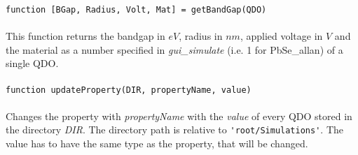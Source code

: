 			\lstinline{function [BGap, Radius, Volt, Mat] = getBandGap(QDO)} \\ \\
				This function returns the bandgap in $eV$, radius in $nm$, applied voltage in $V$ and the material as a number specified in {\it gui\_simulate}
				(i.e. 1 for PbSe\_allan) of a single QDO. \\ \\
			
			\lstinline{function updateProperty(DIR, propertyName, value)} \\ \\
				Changes the property with {\it propertyName} with the {\it value} of every QDO stored in the directory {\it DIR}. The directory path is
				relative to \lstinline{'root/Simulations'}. The value has to have the same type as the property, that will be changed. \\ \\